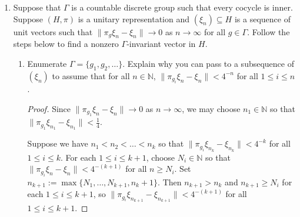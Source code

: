 \documentclass[a4paper,10pt]{report}
\DeclarePairedDelimiter{\set}{\{}{\}}
\newcommand{\N}{\mathbb{N}}
\begin{document}
\begin{enumerate}
\begin{proof}
		Let $A,B\in M$ be commuting positive operators. The product of commuting normal elements is normal, so it suffices to show that $\spec(AB)\subseteq\mathbb{R}$. We claim that $\Spec(AB)\subseteq\Spec(A)\Spec(B)$. If we let $N=\set{A,B}''$, then $N$ is a commuting von Neumann algebra, so by taking the Gelfand transform, $\Spec_N(B)\subseteq\Spec_N(A)\Spec_N(B)$. Now $\Spec_M\subseteq\Spec_N$, since $M\supseteq N$. However, $\Spec_N(A)=\Spec_M(A)$, because if $A-\lambda I$ is invertible in $A$, then by the continuous functional calculus, the inverse commutes with $A$ and $B$, and is therefore in $N$; similarly for $B$. Therefore, $\Spec_M(AB)\subseteq\Spec_N(AB)\subseteq\Spec_M(A)\Spec_M(B)\subseteq\mathbb{R}$. 
		\end{proof}
		\setcounter{enumi}{111}
	\item	Suppose that $\Gamma$ is a countable discrete group such that every cocycle is inner.
		Suppose $(H, \pi)$ is a unitary representation and $(\xi_n) \subseteq H$
		is a sequence of unit vectors such that $\|\pi_g\xi_n - \xi_n\| \to 0$ as $n \to \infty$
		for all $g \in \Gamma$.
		Follow the steps below to find a nonzero $\Gamma$-invariant vector in $H$.
		\begin{enumerate}
			\item Enumerate $\Gamma = \{g_1, g_2, \dots\}$.
				Explain why you can pass to a subsequence of $(\xi_n)$ to assume that
				for all $n \in \N$, $\|\pi_{g_i}\xi_n - \xi_n\| < 4^{-n}$ for all $1 \le i \le n$.
				\begin{proof}
					Since $\|\pi_{g_1}\xi_n - \xi_n\| \to 0$ as $n \to \infty$, we may
					choose $n_1 \in \N$ so that $\|\pi_{g_1}\xi_{n_1} - \xi_{n_1}\| < \frac{1}{4}$.
					
					Suppose we have $n_1 < n_2 < \dots < n_k$ so that
					$\|\pi_{g_i}\xi_{n_k} - \xi_{n_k}\| < 4^{-k}$ for all $1 \le i \le k$.
					For each $1 \le i \le k + 1$, choose $N_i \in \N$ so that
					$\|\pi_{g_i}\xi_n - \xi_n\| < 4^{-(k+1)}$ for all $n \ge N_i$.
					Set $n_{k+1} := \max\{N_1, \dots, N_{k+1}, n_k + 1\}$.
					Then $n_{k+1} > n_k$ and $n_{k+1} \ge N_i$ for each $1 \le i \le k+1$, so
					$\|\pi_{g_i}\xi_{n_{k+1}} - \xi_{n_{k+1}}\| < 4^{-(k+1)}$ for all $1 \le i \le k+1$.
					

\end{proof}
\end{enumerate}
\end{enumerate}
\end{document}
